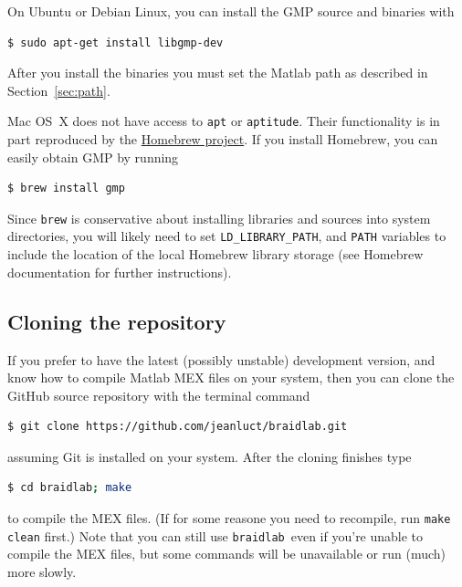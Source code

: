 \documentclass[12pt]{article}
\newcommand{\braidlab}{\texttt{braidlab}}%
\begin{document}
On Ubuntu or Debian Linux, you can install the GMP source and binaries with
\begin{lstlisting}[frame=single,framerule=0pt,escapechar=*,%
  language=bash,backgroundcolor=\color{white}]
$ sudo apt-get install libgmp-dev
\end{lstlisting}
After you install the binaries you must set the Matlab path as described in
Section~\ref{sec:path}.

%
Mac OS~X does not have access to \lstinline{apt} or
\lstinline{aptitude}. Their functionality is in part reproduced by the %
%
%
\href{https://brew.sh/}{Homebrew project}. If you install Homebrew, you can
easily obtain GMP by running
\begin{lstlisting}[frame=single,framerule=0pt,escapechar=*,%
  language=bash,backgroundcolor=\color{white}]
$ brew install gmp
\end{lstlisting}
Since \lstinline{brew} is conservative about installing libraries and
sources into system directories, you will likely need to set
\lstinline{LD_LIBRARY_PATH}, and \lstinline{PATH} variables to include
the location of the local Homebrew library storage (see Homebrew
documentation for further instructions).

%


\subsection{Cloning the repository}
\label{sec:cloning}

 If you prefer to have the latest (possibly unstable) development
version, and know how to compile Matlab MEX %
 files on your system, then you can clone the GitHub
source repository with the terminal command
\begin{lstlisting}[frame=single,framerule=0pt,escapechar=*,%
  language=bash,backgroundcolor=\color{white}]
$ git clone https://github.com/jeanluct/braidlab.git
\end{lstlisting}
assuming Git is installed on your system.  After the cloning finishes type
\begin{lstlisting}[frame=single,framerule=0pt,escapechar=*,%
  language=bash,backgroundcolor=\color{white}]
$ cd braidlab; make
\end{lstlisting}
to compile the MEX files.  (If for some reasone you need to recompile, run
\lstinline{make clean} first.)  Note that you can still use \braidlab\ even if
you're unable to compile the MEX files, but some commands will be unavailable
or run (much) more slowly. %
\end{document}
